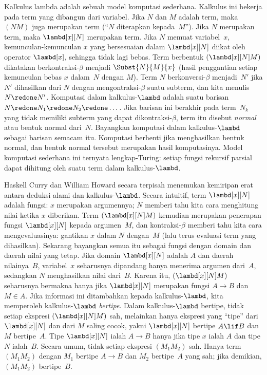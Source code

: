 \documentclass[../../../include/open-logic-section]{subfiles}
\begin{document}


Kalkulus lambda adalah sebuah model komputasi sederhana. Kalkulus ini
bekerja pada term yang dibangun dari variabel. Jika $N$ dan $M$ adalah
term, maka $(NM)$ juga merupakan term (``$N$ diterapkan kepada~$M$'').
Jika $N$ merupakan term, maka $\lambd[x][N]$ merupakan term. Jika $N$
memuat variabel~$x$, kemunculan-kemunculan $x$ yang bersesuaian dalam
$\lambd[x][N]$ diikat oleh operator $\lambd[x]$, sehingga tidak lagi
bebas. Term berbentuk $(\lambd[x][N]M)$ dikatakan
berkontraksi-$\beta$ menjadi $\Subst{N}{M}{x}$ (hasil penggantian setiap
kemunculan bebas $x$ dalam~$N$ dengan $M$). Term $N$
berkonversi-$\beta$ menjadi~$N'$ jika $N'$ dihasilkan dari $N$ dengan
mengontraksi-$\beta$ suatu subterm, dan kita menulis $N \redone N'$.
Komputasi dalam kalkulus-$\lambd$ adalah suatu barisan $N \redone N_1
\redone N_2 \redone \dots$. Jika barisan ini berakhir pada term~$N_k$
yang tidak memiliki subterm yang dapat dikontraksi-$\beta$, term itu
disebut \emph{normal} atau bentuk normal dari~$N$. Bayangkan komputasi
dalam kalkulus-$\lambd$ sebagai barisan semacam itu. Komputasi berhenti
jika menghasilkan bentuk normal, dan bentuk normal tersebut merupakan
hasil komputasinya. Model komputasi sederhana ini ternyata
lengkap-Turing: setiap fungsi rekursif parsial dapat dihitung oleh suatu
term dalam kalkulus-$\lambd$.

Haskell Curry dan William Howard secara terpisah menemukan kemiripan erat
antara deduksi alami dan kalkulus-$\lambd$. Secara intuitif, term
$\lambd[x][N]$ adalah fungsi: $x$ merupakan argumennya; $N$ memberi tahu
kita cara menghitung nilai ketika $x$ diberikan. Term
$(\lambd[x][N]M)$ kemudian merupakan penerapan fungsi $\lambd[x][N]$
kepada argumen~$M$, dan kontraksi-$\beta$ memberi tahu kita cara
mengevaluasinya: gantikan $x$ dalam $N$ dengan~$M$ (lalu terus evaluasi
term yang dihasilkan). Sekarang bayangkan semua itu sebagai fungsi dengan
domain dan daerah nilai yang tetap. Jika domain $\lambd[x][N]$ adalah
$A$ dan daerah nilainya~$B$, variabel~$x$ seharusnya dipandang hanya
menerima argumen dari~$A$, sedangkan $N$ menghasilkan nilai dari~$B$.
Karena itu, $(\lambd[x][N]M)$ seharusnya bermakna hanya jika
$\lambd[x][N]$ merupakan fungsi $A \to B$ dan $M \in A$. Jika informasi
ini ditambahkan kepada kalkulus-$\lambd$, kita memperoleh
kalkulus-$\lambd$ \emph{bertipe}. Dalam kalkulus-$\lambd$ bertipe, tidak
setiap ekspresi $(\lambd[x][N]M)$ sah, melainkan hanya ekspresi yang
``tipe'' dari $\lambd[x][N]$ dan dari $M$ saling cocok, yakni
$\lambd[x][N]$ bertipe $A \lif B$ dan $M$ bertipe~$A$. Tipe
$\lambd[x][N]$ ialah $A \to B$ hanya jika tipe $x$ ialah $A$ dan tipe
$N$ ialah~$B$. Secara umum, tidak setiap ekspresi $(M_1M_2)$ sah. Hanya
term $(M_1M_2)$ dengan $M_1$ bertipe $A \to B$ dan $M_2$ bertipe~$A$
yang sah; jika demikian, $(M_1M_2)$ bertipe~$B$.
\end{document}
